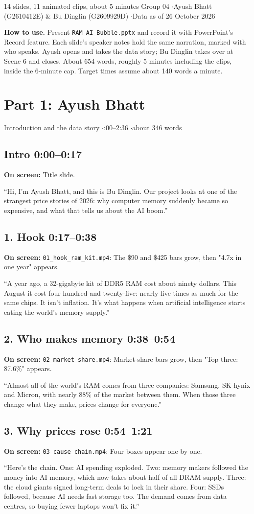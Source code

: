 \documentclass[11pt]{article}
\newcommand{\scene}[4]{%
  \needspace{7\baselineskip}\subsection*{#1 \hfill {\normalfont\color{muted}\small #2}}
  {\small\color{muted}\textbf{On screen:} #3}\par\vspace{-0.2em}
  \begin{keybox}#4\end{keybox}}
\begin{document}
{14 slides, 11 animated clips, about 5 minutes}
{Group 04 \quad$\cdot$\quad Ayush Bhatt (G2610412E) \& Bu Dinglin (G2609929D) \quad$\cdot$\quad Data as of 26 October 2026}

\textbf{How to use.} Present \texttt{RAM\_AI\_Bubble.pptx} and record it with PowerPoint's Record feature. Each slide's speaker notes hold the same narration, marked with who speaks. Ayush opens and takes the data story; Bu Dinglin takes over at Scene 6 and closes. About 654 words, roughly 5 minutes including the clips, inside the 6-minute cap. Target times assume about 140 words a minute.

\section*{Part 1: Ayush Bhatt}
{\color{muted}Introduction and the data story \quad$\cdot$:00--2:36 \quad$\cdot$\quad about 346 words}

\scene{Intro}{0:00--0:17}
{Title slide.}
{``Hi, I'm Ayush Bhatt, and this is Bu Dinglin. Our project looks at one of the strangest price stories of 2026: why computer memory suddenly became so expensive, and what that tells us about the AI boom.''}

\scene{1. Hook}{0:17--0:38}
{\texttt{01\_hook\_ram\_kit.mp4}: The \$90 and \$425 bars grow, then "4.7x in one year" appears.}
{``A year ago, a 32-gigabyte kit of DDR5 RAM cost about ninety dollars. This August it cost four hundred and twenty-five: nearly five times as much for the same chips. It isn't inflation. It's what happens when artificial intelligence starts eating the world's memory supply.''}

\scene{2. Who makes memory}{0:38--0:54}
{\texttt{02\_market\_share.mp4}: Market-share bars grow, then "Top three: 87.6\%" appears.}
{``Almost all of the world's RAM comes from three companies: Samsung, SK hynix and Micron, with nearly 88\% of the market between them. When those three change what they make, prices change for everyone.''}

\scene{3. Why prices rose}{0:54--1:21}
{\texttt{03\_cause\_chain.mp4}: Four boxes appear one by one.}
{``Here's the chain. One: AI spending exploded. Two: memory makers followed the money into AI memory, which now takes about half of all DRAM supply. Three: the cloud giants signed long-term deals to lock in their share. Four: SSDs followed, because AI needs fast storage too. The demand comes from data centres, so buying fewer laptops won't fix it.''}
\end{document}
